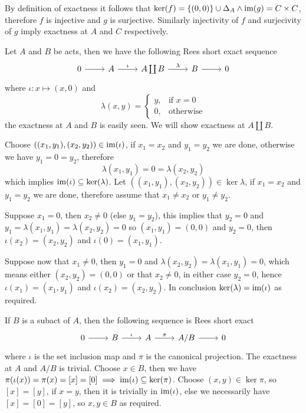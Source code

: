 \begin{remark}
    By definition of exactness it follows that $\mathrm{ker}(f) = \{(0,0)\}\cup\Delta_A \land \text{im}(g)= C\times C$, therefore 
    $f$ is injective and $g$ is surjective. Similarly injectivity of $f$ and surjecivity of $g$ imply exactness at $A$ 
    and $C$ respectively.
\end{remark}
\begin{example}
    Let $A$ and $B$ be acts, then we have the following Rees short exact sequence
    \[\begin{tikzcd}
        0 & A & {A\coprod B} & B & 0
        \arrow[from=1-1, to=1-2]
        \arrow["\iota", from=1-2, to=1-3]
        \arrow["\lambda", from=1-3, to=1-4]
        \arrow[from=1-4, to=1-5]
    \end{tikzcd}\]
    where $\iota: x \mapsto (x,0)$ and 
    \[
        \lambda(x,y) = 
        \begin{cases}
            y, & \text{if } x=0 \\
            0, & \text{otherwise}
        \end{cases}
    \]
    the exactness at $A$ and $B$ is easily seen. We will show exactness 
    at $A\coprod B$.\par
    Choose $((x_1,y_1),(x_2,y_2))\in\text{im}(\iota)$, if $x_1=x_2$ and $y_1=y_2$ we are done, 
    otherwise we have $y_1=0=y_2$, therefore 
    \[
        \lambda(x_1,y_1)=0=\lambda(x_2,y_2)
    \]
    which implies $\text{im}(\iota)\subseteq\mathrm{ker}(\lambda)$.
    Let $((x_1,y_1),(x_2,y_2))\in\ker{\lambda}$, if $x_1=x_2$ and $y_1=y_2$
    we are done, therefore assume that $x_1\neq x_2$ or $y_1\neq y_2$.\par
    Suppose $x_1=0$, then $x_2\neq 0$ (else $y_1=y_2$), this implies
    that $y_2=0$ and $y_1=\lambda(x_1,y_1)=\lambda(x_2,y_2)=0$
    so $(x_1,y_1)=(0,0)$ and $y_2=0$, then 
    $\iota(x_2)=(x_2,y_2)$ and $\iota(0)=(x_1,y_1)$.\par
    Suppose now that $x_1\neq 0$, then $y_1=0$ and 
    $\lambda(x_2,y_2)=\lambda(x_1,y_1)=0$, which means either 
    $(x_2,y_2)=(0,0)$ or that $x_2\neq 0$, in either case $y_2=0$,
    hence $\iota(x_1)=(x_1,y_1)$ and $\iota(x_2)=(x_2,y_2)$.
    In conclusion $\mathrm{ker}(\lambda)=\text{im}(\iota)$ as required.
\end{example}
\begin{example}
    If $B$ is a subact of $A$, then the following sequence is Rees short exact 
    \[\begin{tikzcd}
        0 & B & A & {A/B} & 0
        \arrow[from=1-1, to=1-2]
        \arrow["\iota", from=1-2, to=1-3]
        \arrow["\pi", from=1-3, to=1-4]
        \arrow[from=1-4, to=1-5]
    \end{tikzcd}\]
    where $\iota$ is the set inclusion map and $\pi$ is the canonical projection. 
    The exactness at $A$ and $A/B$ is trivial. Choose $x\in B$, then we have 
    $\pi(\iota(x)) = \pi(x) = [x] = [0] \implies \text{im}(\iota)\subseteq\mathrm{ker}(\pi)$. Choose 
    $(x,y)\in\ker{\pi}$, so $[x]=[y]$, if $x=y$, then it is trivially in $\text{im}(\iota)$, else 
    we necessarily have $[x]=[0]=[y]$, so $x,y\in B$ as required.
\end{example}

